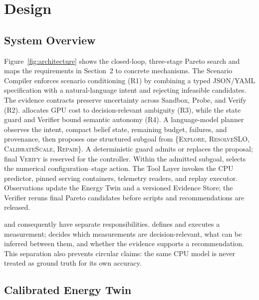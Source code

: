 \section{\system{} Design}

\subsection{System Overview}

Figure~\ref{fig:architecture} shows the closed-loop, three-stage Pareto search
and maps the requirements in Section~2 to concrete mechanisms.  The Scenario
Compiler enforces scenario conditioning (R1) by combining a typed JSON/YAML
specification with a natural-language intent and rejecting infeasible
candidates.  The evidence contracts preserve uncertainty across Sandbox,
Probe, and Verify (R2).  \ipig{} allocates GPU cost to decision-relevant
ambiguity (R3), while the state guard and Verifier bound semantic autonomy
(R4).  A language-model planner observes the intent, compact belief state,
remaining budget, failures, and provenance, then proposes one structured
subgoal from \{\textsc{Explore}, \textsc{ResolveSLO},
\textsc{CalibrateScale}, \textsc{Repair}\}.  A deterministic guard admits or
replaces the proposal; final \textsc{Verify} is reserved for the controller.
Within the admitted subgoal, \ipig{} selects the numerical
configuration--stage action.  The Tool Layer invokes the CPU predictor, pinned
serving containers, telemetry readers, and replay executor.  Observations
update the Energy Twin and a versioned Evidence Store; the Verifier reruns final
Pareto candidates before scripts and recommendations are released.



\bench{} and \system{} consequently have separate responsibilities.  \bench{}
defines and executes a measurement; \system{} decides which measurements are
decision-relevant, what can be inferred between them, and whether the evidence
supports a recommendation.  This separation also prevents circular claims:
the same CPU model is never treated as ground truth for its own accuracy.

\subsection{Calibrated Energy Twin}

